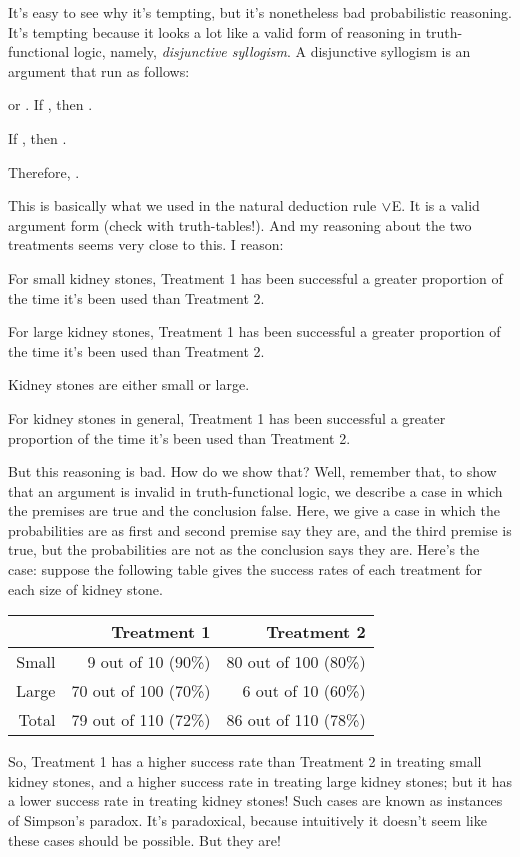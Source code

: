 It's easy to see why it's tempting, but it's nonetheless bad probabilistic reasoning. It's tempting because it looks a lot like a valid form of reasoning in truth-functional logic, namely, \emph{disjunctive syllogism}. A disjunctive syllogism is an argument that run as follows:
\begin{earg}
\prem \metaX or \metaY.
\prem If \metaX, then \metaZ.

\prem If \metaY, then \metaZ.

\conc Therefore, \metaZ.
\end{earg}
This is basically what we used in the natural deduction rule $\vee$E. It is a valid argument form (check with truth-tables!). And my reasoning about the two treatments seems very close to this. I reason:
\begin{earg}
\prem For small kidney stones, Treatment 1 has been successful a greater proportion of the time it's been used than Treatment 2.

\prem For large kidney stones, Treatment 1 has been successful a greater proportion of the time it's been used than Treatment 2.

\prem Kidney stones are either small or large.

\conc For kidney stones in general, Treatment 1 has been successful a greater proportion of the time it's been used than Treatment 2.
\end{earg}
But this reasoning is bad. How do we show that? Well, remember that, to show that an argument is invalid in truth-functional logic, we describe a case in which the premises are true and the conclusion false. Here, we give a case in which the probabilities are as first and second premise say they are, and the third premise is true, but the probabilities are not as the conclusion says they are. Here's the case: suppose the following table gives the success rates of each treatment for each size of kidney stone.
\begin{center}
\begin{tabular}{r|r|r}
& Treatment 1 & Treatment 2 \\
\hline 
Small & 9 out of 10 (90\%) & 80 out of 100 (80\%) \\
Large & 70 out of 100 (70\%) & 6 out of 10 (60\%) \\
\hline 
Total & 79 out of 110 (72\%) & 86 out of 110 (78\%) 
\end{tabular}
\end{center}
So, Treatment 1 has a higher success rate than Treatment 2 in treating small kidney stones, and a higher success rate in treating large kidney stones; but it has a lower success rate in treating kidney stones! Such cases are known as instances of Simpson's paradox. It's paradoxical, because intuitively it doesn't seem like these cases should be possible. But they are!

